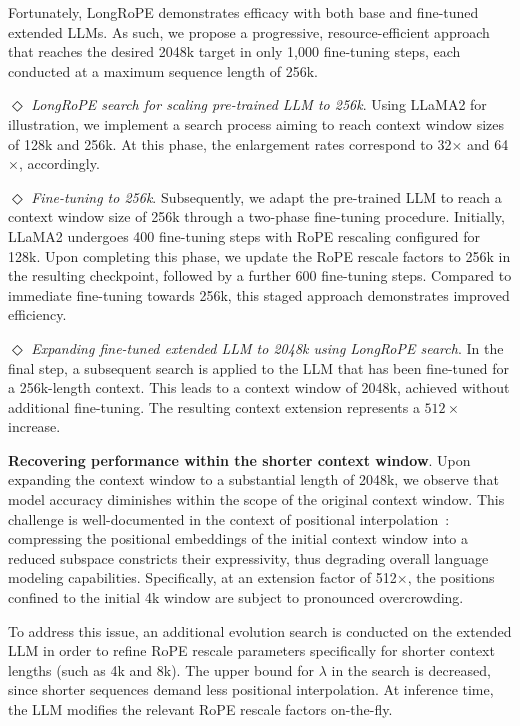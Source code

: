 Fortunately, LongRoPE demonstrates efficacy with both base and fine-tuned extended LLMs. As such, we propose a progressive, resource-efficient approach that reaches the desired 2048k target in only 1,000 fine-tuning steps, each conducted at a maximum sequence length of 256k.

$\Diamond$ \textit{LongRoPE search for scaling pre-trained LLM to 256k}. Using LLaMA2 for illustration, we implement a search process aiming to reach context window sizes of 128k and 256k. At this phase, the enlargement rates correspond to 32$\times$ and 64$\times$, accordingly.

$\Diamond$ \textit{Fine-tuning to 256k}. Subsequently, we adapt the pre-trained LLM to reach a context window size of 256k through a two-phase fine-tuning procedure. Initially, LLaMA2 undergoes 400 fine-tuning steps with RoPE rescaling configured for 128k. Upon completing this phase, we update the RoPE rescale factors to 256k in the resulting checkpoint, followed by a further 600 fine-tuning steps. Compared to immediate fine-tuning towards 256k, this staged approach demonstrates improved efficiency.

$\Diamond$ \textit{Expanding fine-tuned extended LLM to 2048k using LongRoPE search}. In the final step, a subsequent search is applied to the LLM that has been fine-tuned for a 256k-length context. This leads to a context window of 2048k, achieved without additional fine-tuning. The resulting context extension represents a $512\times$ increase.

\textbf{Recovering performance within the shorter context window}. Upon expanding the context window to a substantial length of 2048k, we observe that model accuracy diminishes within the scope of the original context window. This challenge is well-documented in the context of positional interpolation~\cite{pi}: compressing the positional embeddings of the initial context window into a reduced subspace constricts their expressivity, thus degrading overall language modeling capabilities. Specifically, at an extension factor of 512$\times$, the positions confined to the initial 4k window are subject to pronounced overcrowding.

To address this issue, an additional evolution search is conducted on the extended LLM in order to refine RoPE rescale parameters specifically for shorter context lengths (such as 4k and 8k). The upper bound for $\lambda$ in the search is decreased, since shorter sequences demand less positional interpolation. At inference time, the LLM modifies the relevant RoPE rescale factors on-the-fly.

